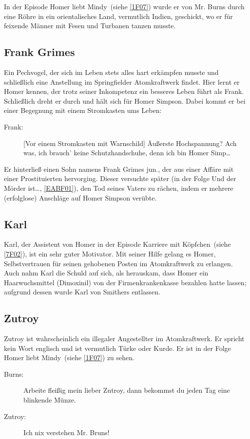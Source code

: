 In der Episode \glqq Homer liebt Mindy\grqq\ (siehe \ref{1F07}) wurde er von Mr. Burns durch eine Röhre in ein orientalisches Land, vermutlich Indien, geschickt, wo er für feixende Männer mit Fesen und Turbanen tanzen musste.
 
 
\subsection{Frank Grimes}
Ein Pechvogel, der sich im Leben stets alles hart erkämpfen musste und schließlich eine Anstellung im Springfielder Atomkraftwerk findet. Hier lernt er Homer kennen, der trotz seiner Inkompetenz ein besseres Leben führt als Frank. Schließlich dreht er durch und hält sich für Homer Simpson. Dabei kommt er bei einer Begegnung mit einem Stromkasten ums Leben:
\begin{description}
	\item[Frank:] [Vor einem Stromkasten mit Warnschild] \glqq Äußerste Hochspannung? Ach was, ich brauch' keine Schutzhandschuhe, denn ich bin Homer Simp\dots \grqq 
\end{description}
Er hinterließ einen Sohn namens Frank Grimes jun., der aus einer Affäre mit einer Prostituierten hervorging. Dieser versuchte später (in der Folge \glqq Und der Mörder ist\dots\grqq , \ref{EABF01}), den Tod seines Vaters zu rächen, indem er mehrere (erfolglose) Anschläge auf Homer Simpson verübte.

\subsection{Karl}
Karl, der Assistent von Homer in der Episode \glqq Karriere mit Köpfchen\grqq\ (siehe \ref{7F02}), ist ein sehr guter Motivator. Mit seiner Hilfe gelang es Homer, Selbstvertrauen für seinen gehobenen Posten im Atomkraftwerk zu erlangen. Auch nahm Karl die Schuld auf sich, als herauskam, dass Homer ein Haarwuchsmittel (Dimoxinil) von der Firmenkrankenkasse bezahlen hatte lassen; aufgrund dessen wurde Karl von Smithers entlassen.


\subsection{Zutroy}
Zutroy ist wahrscheinlich ein illegaler Angestellter im Atomkraftwerk. Er spricht kein Wort englisch und ist vermutlich Türke oder Kurde. Er ist in der Folge \glqq Homer liebt Mindy\grqq\ (siehe \ref{1F07}) zu sehen.
\begin{description}
	\item[Burns:] Arbeite fleißig mein lieber Zutroy, dann bekommst du jeden Tag eine blinkende Münze.
	\item[Zutroy:] Ich nix verstehen Mr. Bruns! 
\end{description}



